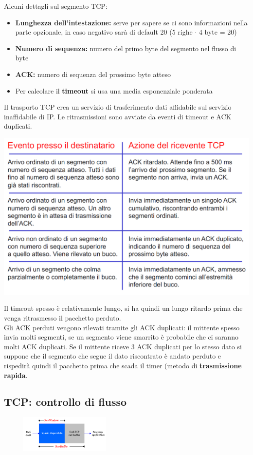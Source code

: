 \documentclass{report}
\begin{document}
	Alcuni dettagli sul segmento TCP:
	\begin{itemize}
		\item \textbf{Lunghezza dell'intestazione:} serve per sapere se ci sono informazioni nella parte opzionale, in caso negativo sarà di default 20 (5 righe \(\cdot\) 4 byte = 20)
		\item \textbf{Numero di sequenza:} numero del primo byte del segmento nel flusso di byte
		\item \textbf{ACK:} numero di sequenza del prossimo byte atteso
		\item Per calcolare il \textbf{timeout} si usa una media esponenziale ponderata
	\end{itemize}
	Il trasporto TCP crea un servizio di trasferimento dati affidabile sul servizio inaffidabile di IP. Le ritrasmissioni sono avviate da eventi di timeout e ACK duplicati.
	\begin{center}
		\includegraphics[width=0.7\linewidth]{eventi-tcp}
	\end{center}
	Il timeout spesso è relativamente lungo, si ha quindi un lungo ritardo prima che venga ritrasmesso il pacchetto perduto.
	\medskip\\Gli ACK perduti vengono rilevati tramite gli ACK duplicati: il mittente spesso invia molti segmenti, se un segmento viene smarrito è probabile che ci saranno molti ACK duplicati. Se il mittente riceve 3 ACK duplicati per lo stesso dato si suppone che il segmento che segue il dato riscontrato è andato perduto e rispedirà quindi il pacchetto prima che scada il timer (metodo di \textbf{trasmissione rapida}. 
	\subsection{TCP: controllo di flusso}
	\begin{figure}
		\centering
		\includegraphics[width=0.4\textwidth]{controllo-di-flusso}
		\vspace{-20pt}
	\end{figure}
	
\end{document}
